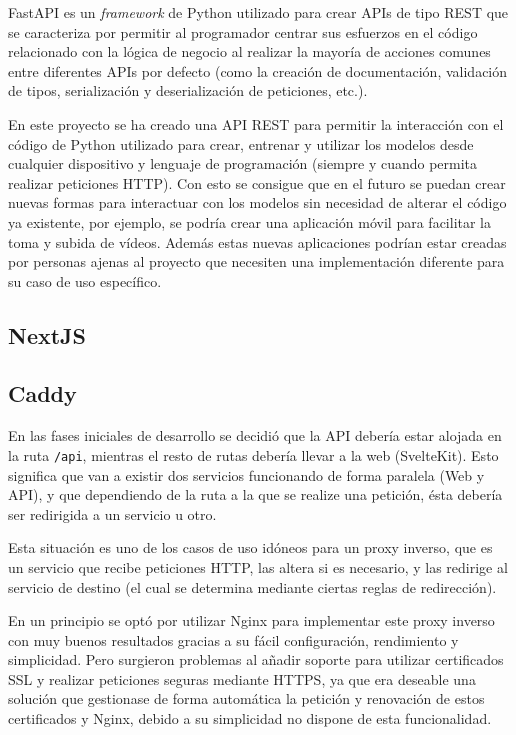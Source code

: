 FastAPI es un \textit{framework} de Python utilizado para crear APIs de tipo
REST que se caracteriza por permitir al programador centrar sus esfuerzos en el
código relacionado con la lógica de negocio al realizar la mayoría de acciones
comunes entre diferentes APIs por defecto (como la creación de documentación,
validación de tipos, serialización y deserialización de peticiones, etc.).

En este proyecto se ha creado una API REST para permitir la interacción con el
código de Python utilizado para crear, entrenar y utilizar los modelos desde
cualquier dispositivo y lenguaje de programación (siempre y cuando permita
realizar peticiones HTTP). Con esto se consigue que en el futuro se puedan crear
nuevas formas para interactuar con los modelos sin necesidad de alterar el
código ya existente, por ejemplo, se podría crear una aplicación móvil para
facilitar la toma y subida de vídeos. Además estas nuevas aplicaciones podrían
estar creadas por personas ajenas al proyecto que necesiten una implementación
diferente para su caso de uso específico.


\subsection{NextJS}


\subsection{Caddy}

En las fases iniciales de desarrollo se decidió que la API debería estar alojada
en la ruta \texttt{/api}, mientras el resto de rutas debería llevar a la web
(SvelteKit). Esto significa que van a existir dos servicios funcionando de forma
paralela (Web y API), y que dependiendo de la ruta a la que se realize una
petición, ésta debería ser redirigida a un servicio u otro.

Esta situación es uno de los casos de uso idóneos para un proxy inverso, que es
un servicio que recibe peticiones HTTP, las altera si es necesario, y las
redirige al servicio de destino (el cual se determina mediante ciertas reglas de
redirección).

En un principio se optó por utilizar Nginx para implementar este proxy inverso
con muy buenos resultados gracias a su fácil configuración, rendimiento y
simplicidad. Pero surgieron problemas al añadir soporte para utilizar
certificados SSL y realizar peticiones seguras mediante HTTPS, ya que era
deseable una solución que gestionase de forma automática la petición y
renovación de estos certificados y Nginx, debido a su simplicidad no dispone de
esta funcionalidad.

